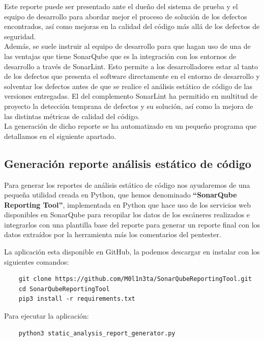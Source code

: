 \newpage
Este reporte puede ser presentado ante el dueño del sistema de prueba y el equipo de desarrollo para abordar mejor 
el proceso de solución de los defectos encontrados, así como mejoras en la calidad del código más allá de los defectos de seguridad.\\

Además, se suele instruir al equipo de desarrollo para que hagan uso de una de las ventajas que tiene SonarQube 
que es la integración con los entornos de desarrollo a través de SonarLint. Esto permite a los desarrolladores 
estar al tanto de los defectos que presenta el software directamente en el entorno de desarrollo y solventar 
los defectos antes de que se realice el análisis estático de código de las versiones entregadas. El del complemento SonarLint
 ha permitido en multitud de proyecto la detección temprana de defectos y su solución, así como la mejora 
 de las distintas métricas de calidad del código.\\

La generación de dicho reporte se ha automatizado en un pequeño programa que detallamos en el siguiente apartado.


\subsection{Generación reporte análisis estático de código}

Para generar los reportes de análisis estático de código nos ayudaremos de una pequeña utilidad creada en Python, que hemos 
denominado \textbf{“SonarQube Reporting Tool”}, implementada en Python que hace uso de los servicios web disponibles en SonarQube
para recopilar los datos de los escáneres realizados e integrarlos con una plantilla base del 
reporte para generar un reporte final con los datos extraídos por la herramienta más los comentarios del pentester.

La aplicación esta disponible en GitHub, la podemos descargar en instalar con los siguientes comandos:
\begin{verbatim}
    git clone https://github.com/M0l1n3ta/SonarQubeReportingTool.git
    cd SonarQubeReportingTool
    pip3 install -r requirements.txt
\end{verbatim}

Para ejecutar la aplicación:
\begin{verbatim}
    python3 static_analysis_report_generator.py
\end{verbatim}


